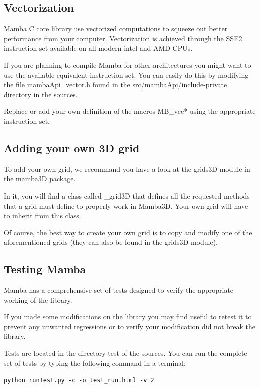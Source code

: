 \documentclass[a4paper,10pt,oneside]{article}
\begin{document}
\subsection{Vectorization}
\label{cha:vectorization}

Mamba C core library use vectorized computations to squeeze out better 
performance from your computer. Vectorization is achieved through the SSE2
instruction set available on all modern intel and AMD CPUs.

If you are planning to compile Mamba for other architectures you might want to
use the available equivalent instruction set. You can easily do this by modifying
the file mambaApi\_vector.h found in the src/mambaApi/include-private directory
in the sources.

Replace or add your own definition of the macros MB\_vec* using the appropriate
instruction set.

\subsection{Adding your own 3D grid}
\label{cha:create_grid3D}

To add your own grid, we recommand you have a look at the grids3D module in
the mamba3D package.

In it, you will find a class called \_grid3D that defines all the requested
methods that a grid must define to properly work in Mamba3D. Your own grid
will have to inherit from this class.

Of course, the best way to create your own grid is to copy and modify one
of the aforementioned grids (they can also be found in the grids3D module).

\subsection{Testing Mamba}
\label{cha:testing_mamba}

Mamba has a comprehensive set of tests designed to verify the appropriate
working of the library.

If you made some modifications on the library you may find useful to retest it
to prevent any unwanted regressions or to verify your modification did not break
the library.

Tests are located in the directory test of the sources. You can run the complete
set of tests by typing the following command in a terminal:

\texttt{python runTest.py -c -o test\_run.html -v 2}
\end{document}
